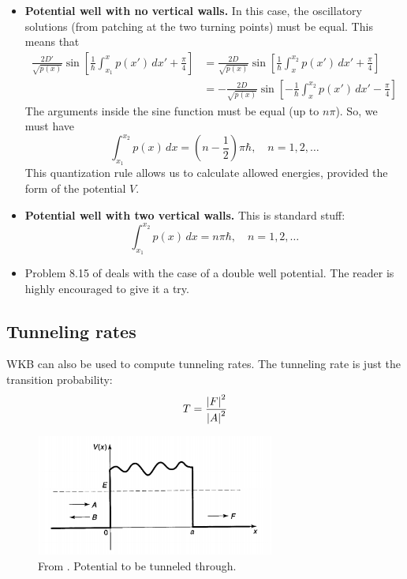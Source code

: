 \documentclass{book}
\theoremstyle{definition}
\newcommand{\f}[2]{\frac{#1}{#2}}
\newcommand{\lp}{\left(}
\newcommand{\rp}{\right)}
\newcommand{\lb}{\left[}
\newcommand{\rb}{\right]}
\begin{document}
\begin{itemize}
	
	\item \textbf{Potential well with no vertical walls.} In this case, the oscillatory solutions (from patching at the two turning points) must be equal. This means that
	\begin{align*}
	\f{2D'}{\sqrt{p(x)}} \sin\lb \f{1}{\hbar} \int_{x_1}^{x} p(x')\,dx' + \f{\pi}{4} \rb 
	&= \f{2D}{\sqrt{p(x)}} \sin\lb \f{1}{\hbar} \int_x^{x_2} p(x')\,dx' + \f{\pi}{4} \rb \\
	&= -\f{2D}{\sqrt{p(x)}} \sin\lb - \f{1}{\hbar} \int_x^{x_2} p(x')\,dx' - \f{\pi}{4} \rb 
	\end{align*}
	The arguments inside the sine function must be equal (up to $n\pi$). So, we must have
	\begin{equation*}
	\boxed{\int_{x_1}^{x_2} p(x)\,dx = \lp n - \f{1}{2} \rp  \pi \hbar, \quad n = 1,2,\dots}
	\end{equation*}
	This quantization rule allows us to calculate allowed energies, provided the form of the potential $V$.
	
	
	
	\item \textbf{Potential well with two vertical walls.} This is standard stuff:
	\begin{equation*}
	\boxed{\int_{x_1}^{x_2}p(x)\,dx = n\pi \hbar, \quad n = 1,2,\dots}
	\end{equation*}
	
	
	
	\item Problem 8.15 of \cite{griffiths2018introduction} deals with the case of a double well potential. The reader  is highly encouraged to give it a try.
\end{itemize}








\subsection*{Tunneling rates}
WKB can also be used to compute tunneling rates. The tunneling rate is just the transition probability:
\begin{equation*}
T = \f{\abs{F}^2}{\abs{A}^2}  
\end{equation*}


\begin{figure}[!htb]
	\centering
	\includegraphics[width=0.7\textwidth]{images/wkb_5}
	\caption{From \cite{griffiths2018introduction}. Potential to be tunneled through.}
\end{figure}
\end{document}
